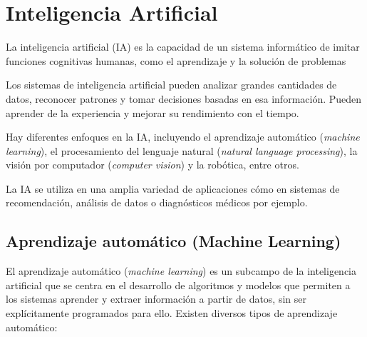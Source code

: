 
\section{Inteligencia Artificial}

La inteligencia artificial (IA) es la capacidad de un sistema informático de imitar funciones cognitivas humanas, como el aprendizaje y la solución de problemas

Los sistemas de inteligencia artificial pueden analizar grandes cantidades de datos, reconocer patrones y tomar decisiones basadas en esa información. Pueden aprender de la experiencia y mejorar su rendimiento con el tiempo. 

Hay diferentes enfoques en la IA, incluyendo el aprendizaje automático (\textit{machine learning}), el procesamiento del lenguaje natural (\textit{natural language processing}), la visión por computador (\textit{computer vision}) y la robótica, entre otros.

La IA se utiliza en una amplia variedad de aplicaciones cómo en sistemas de recomendación, análisis de datos o diagnósticos médicos por ejemplo.

\subsection{Aprendizaje automático (Machine Learning)}
El aprendizaje automático (\textit{machine learning}) es un subcampo de la inteligencia artificial que se centra en el desarrollo de algoritmos y modelos que permiten a los sistemas aprender y extraer información a partir de datos, sin ser explícitamente programados para ello.
Existen diversos tipos de aprendizaje automático:

